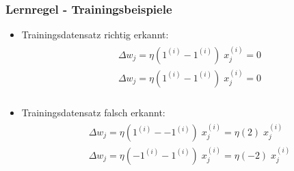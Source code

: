 \begin{frame}
\frametitle{Lernregel - Trainingsbeispiele}

\begin{itemize}
\item Trainingsdatensatz richtig erkannt: 
\begin{align*}
\begin{aligned}
& \Delta w_j = \eta(1^{(i)} - 1^{(i)})\;x^{(i)}_{j} = 0 \\
& \Delta w_j = \eta(1^{(i)} - 1^{(i)})\;x^{(i)}_{j} = 0 \\
\end{aligned}
\end{align*}

\item Trainingsdatensatz falsch erkannt:
\begin{align*}
\begin{aligned}
& \Delta w_j = \eta(1^{(i)} - -1^{(i)})\;x^{(i)}_{j} = \eta(2)\;x^{(i)}_{j} \\
& \Delta w_j = \eta(-1^{(i)} - 1^{(i)})\;x^{(i)}_{j} = \eta(-2)\;x^{(i)}_{j} \\
\end{aligned}
\end{align*}

\end{itemize}
\end{frame}


